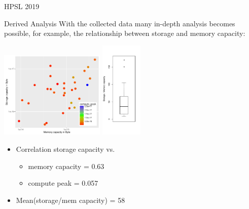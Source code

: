 \documentclass[portrait,a0paper,fontscale=0.4]{baposter}
\newcommand{\compresslist}{%
\setlength{\itemsep}{1pt}%
\setlength{\parskip}{0pt}%
\setlength{\parsep}{0pt}%
}
\begin{document}
\begin{poster}
\begin{posterbox}[name=engineering,column=3]{HPSL 2019}
\end{posterbox}




\begin{posterbox}[name=awareness,column=3,below=engineering]{Derived Analysis}
With the collected data many in-depth analysis becomes possible, for example,
the relationship between storage and memory capacity:

\vspace*{-1em}

\includegraphics[width=5cm]{memstorage}
\includegraphics[width=2cm]{capacitymemory}

\vspace*{-2em}
\begin{itemize}\compresslist
\item Correlation storage capacity vs.
  \begin{itemize}\compresslist
  \item memory capacity = 0.63
  \item compute peak = 0.057
  \end{itemize}
\item Mean(storage/mem capacity) = 58
\end{itemize}

\end{posterbox}


\end{poster}
\end{document}
